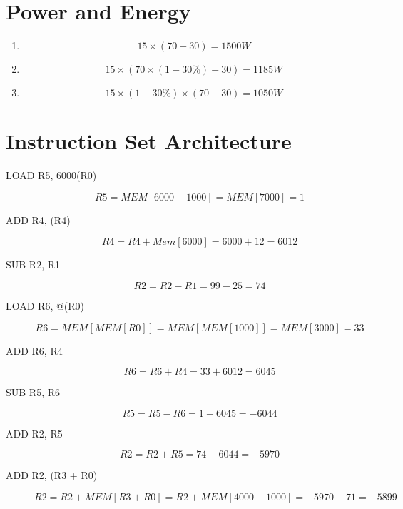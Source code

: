 \documentclass{article}
\begin{document}
	\section{Power and Energy}
	\begin{enumerate}
		\item \begin{equation}
			15 \times (70 + 30) = 1500 W
		\end{equation}
		\item \begin{equation}15 \times (70 \times (1 - 30\%) + 30) = 1185W \end{equation}
		\item \begin{equation}15 \times (1 - 30\%) \times (70 + 30) = 1050W \end{equation}
	\end{enumerate}

	\section{Instruction Set Architecture}
		\begin{description}
		\item[LOAD R5, 6000(R0)] \begin{equation}
			R5 = MEM[6000 + 1000] = MEM[7000] = 1
		\end{equation}
		\item[ADD R4, (R4)] \begin{equation}
			R4 = R4 + Mem[6000] = 6000 + 12 = 6012
		\end{equation}
		\item[SUB R2, R1] \begin{equation}
			R2 = R2 - R1 = 99 - 25 = 74
		\end{equation}
		\item[LOAD R6, @(R0)] \begin{equation}
			R6 = MEM[MEM[R0]] = MEM[MEM[1000]] = MEM[3000] = 33
		\end{equation}
		\item[ADD R6, R4] \begin{equation}
			R6 = R6 + R4 = 33 + 6012 = 6045
		\end{equation}
		\item[SUB R5, R6] \begin{equation}
			R5 = R5 - R6 = 1 - 6045 = -6044
		\end{equation}
		\item[ADD R2, R5] \begin{equation}
			R2 = R2 + R5 = 74 - 6044 = -5970
		\end{equation}
		\item[ADD R2, (R3 + R0)] \begin{equation}
			R2 = R2 + MEM[R3 + R0] = R2 + MEM[4000 + 1000] = -5970 + 71 = -5899
		\end{equation}
		\end{description}
\end{document}
